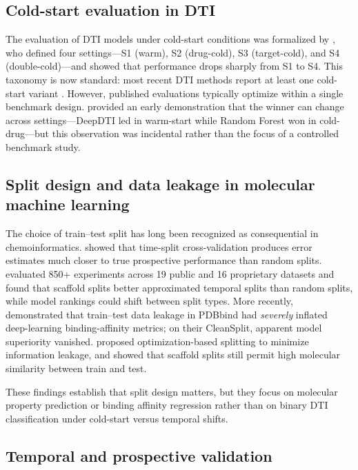 \documentclass[referee,pdflatex,sn-basic,Numbered]{sn-jnl}
\begin{document}
\subsection{Cold-start evaluation in DTI}

The evaluation of DTI models under cold-start conditions was formalized by \citet{pahikkala2015toward}, who defined four settings—S1 (warm), S2 (drug-cold), S3 (target-cold), and S4 (double-cold)—and showed that performance drops sharply from S1 to S4. This taxonomy is now standard: most recent DTI methods report at least one cold-start variant \citep{ahmed2024dtilm,luo2024druglamp,zhao2025coldstartcpi,liu2025spdti}. However, published evaluations typically optimize within a single benchmark design. \citet{wang2021unified} provided an early demonstration that the winner can change across settings—DeepDTI led in warm-start while Random Forest won in cold-drug—but this observation was incidental rather than the focus of a controlled benchmark study.

\subsection{Split design and data leakage in molecular machine learning}

The choice of train--test split has long been recognized as consequential in chemoinformatics. \citet{sheridan2013timesplit} showed that time-split cross-validation produces error estimates much closer to true prospective performance than random splits. \citet{yang2019chemprop} evaluated 850+ experiments across 19 public and 16 proprietary datasets and found that scaffold splits better approximated temporal splits than random splits, while model rankings could shift between split types. More recently, \citet{graber2025resolvingbias} demonstrated that train--test data leakage in PDBbind had \emph{severely} inflated deep-learning binding-affinity metrics; on their CleanSplit, apparent model superiority vanished. \citet{datasail2024} proposed optimization-based splitting to minimize information leakage, and \citet{scaffoldsplitoverestimate2024} showed that scaffold splits still permit high molecular similarity between train and test.

These findings establish that split design matters, but they focus on molecular property prediction or binding affinity regression rather than on binary DTI classification under cold-start versus temporal shifts.

\subsection{Temporal and prospective validation}
\end{document}
